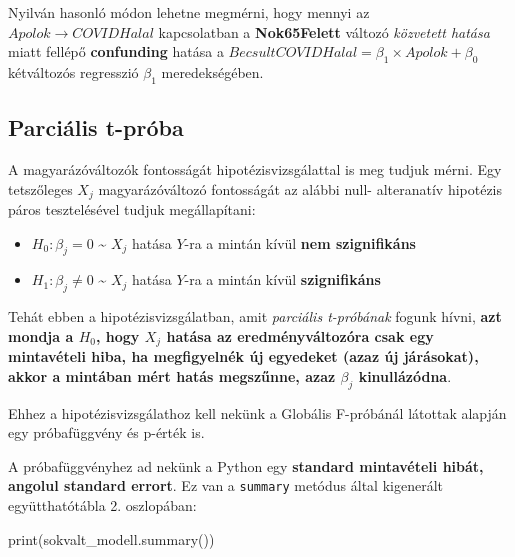 \documentclass[
]{book}
\newenvironment{Shaded}{\begin{snugshade}}{\end{snugshade}}
\newcommand{\BuiltInTok}[1]{#1}
\newcommand{\NormalTok}[1]{#1}
\providecommand{\tightlist}{%
  \setlength{\itemsep}{0pt}\setlength{\parskip}{0pt}}
\begin{document}
Nyilván hasonló módon lehetne megmérni, hogy mennyi az \(Apolok \rightarrow COVIDHalal\) kapcsolatban a \textbf{Nok65Felett} változó \emph{közvetett hatása} miatt fellépő \textbf{confunding} hatása a \(BecsultCOVIDHalal = \beta_1 \times Apolok + \beta_0\) kétváltozós regresszió \(\beta_1\) meredekségében.

\subsection{Parciális t-próba}\label{parciuxe1lis-t-pruxf3ba}

A magyarázóváltozók fontosságát hipotézisvizsgálattal is meg tudjuk mérni. Egy tetszőleges \(X_j\) magyarázóváltozó fontosságát az alábbi null- alteranatív hipotézis páros tesztelésével tudjuk megállapítani:

\begin{itemize}
\tightlist
\item
  \(H_0: \beta_j=0\) \textasciitilde{} \(X_j\) hatása \(Y\)-ra a mintán kívül \textbf{nem szignifikáns}
\item
  \(H_1: \beta_j\neq0\) \textasciitilde{} \(X_j\) hatása \(Y\)-ra a mintán kívül \textbf{szignifikáns}
\end{itemize}

Tehát ebben a hipotézisvizsgálatban, amit \emph{parciális t-próbának} fogunk hívni, \textbf{azt mondja a \(H_0\), hogy \(X_j\) hatása az eredményváltozóra csak egy mintavételi hiba, ha megfigyelnék új egyedeket (azaz új járásokat), akkor a mintában mért hatás megszűnne, azaz \(\beta_j\) kinullázódna}.

Ehhez a hipotézisvizsgálathoz kell nekünk a Globális F-próbánál látottak alapján egy próbafüggvény és p-érték is.

A próbafüggvényhez ad nekünk a Python egy \textbf{standard mintavételi hibát, angolul standard errort}. Ez van a \texttt{summary} metódus által kigenerált együtthatótábla 2. oszlopában:

\begin{Shaded}
\begin{Highlighting}[]
\BuiltInTok{print}\NormalTok{(sokvalt\_modell.summary())}
\end{Highlighting}
\end{Shaded}
\end{document}
